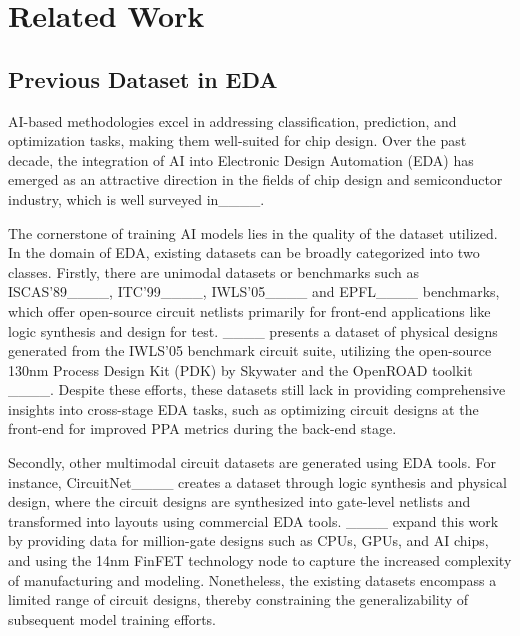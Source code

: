 \section{Related Work}
\label{Sec:Related}
\subsection{Previous Dataset in EDA}
AI-based methodologies excel in addressing classification, prediction, and optimization tasks, making them well-suited for chip design. Over the past decade, the integration of AI into Electronic Design Automation (EDA) has emerged as an attractive direction in the fields of chip design and semiconductor industry, which is well surveyed in____. 

The cornerstone of training AI models lies in the quality of the dataset utilized. In the domain of EDA, existing datasets can be broadly categorized into two classes. Firstly, there are unimodal datasets or benchmarks such as ISCAS'89____, ITC'99____, IWLS'05____ and EPFL____ benchmarks, which offer open-source circuit netlists primarily for front-end applications like logic synthesis and design for test. ____ presents a dataset of physical designs generated from the IWLS'05 benchmark circuit suite, utilizing the open-source 130nm Process Design Kit (PDK) by Skywater and the OpenROAD toolkit ____. 
Despite these efforts, these datasets still lack in providing comprehensive insights into cross-stage EDA tasks, such as optimizing circuit designs at the front-end for improved PPA metrics during the back-end stage.

Secondly, other multimodal circuit datasets are generated using EDA tools. For instance, CircuitNet____ creates a dataset through logic synthesis and physical design, where the circuit designs are synthesized into gate-level netlists and transformed into layouts using commercial EDA tools. ____ expand this work by providing data for million-gate designs such as CPUs, GPUs, and AI chips, and using the 14nm FinFET technology node to capture the increased complexity of manufacturing and modeling. Nonetheless, the existing datasets encompass a limited range of circuit designs, thereby constraining the generalizability of subsequent model training efforts. 


